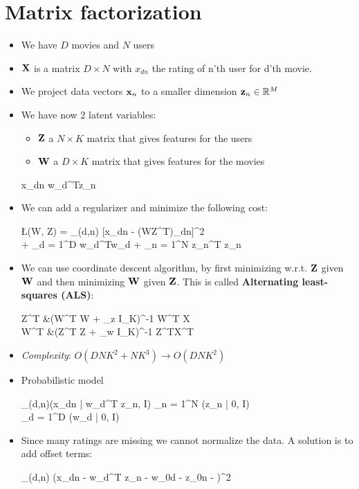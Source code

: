 
\section{Matrix factorization}
\begin{itemize}
	\item We have $D$ movies and $N$ users
	\item $\mathbf{X}$ is a matrix $D \times N$ with $x_{dn}$ the rating of n'th user for d'th movie.
	\item We project data vectors $\mathbf{x}_n$ to a smaller dimension $\mathbf{z}_n \in \Bbb R^M$
	\item We have now 2 latent variables:
	\begin{itemize}
		\item $\mathbf{Z}$ a $N \times K$ matrix that gives features for the users
	 	\item $\mathbf{W}$ a $D \times K$ matrix that gives features for the movies
	 \end{itemize} 
	 \begin{myalign*}
	     x_{dn} \approx \*w_d^T\*z_n
	 \end{myalign*}
	 \item We can add a regularizer and minimize the following cost:
	 \begin{myalign*}
	     \L(\*W, \*Z) = \sum_{(d,n)\in\Omega} [x_{dn} - (\*W\*Z^T)_{dn}]^2 \\ +  \sum_{d = 1}^D \*w_d^T\*w_d +  \sum_{n = 1}^N \*z_n^T \*z_n
	 \end{myalign*}
	 \item We can use coordinate descent algorithm, by first minimizing w.r.t. $\mathbf{Z}$ given $\mathbf{W}$ and then minimizing $\mathbf{W}$ given $\mathbf{Z}$. This is called \textbf{Alternating least-squares (ALS)}:
	 \begin{myalign*}
	     \*Z^T &\leftarrow (\*W^T \*W + \lambda_z \*I_K)^{-1} \*W^T \*X \\
	     \*W^T &\leftarrow (\*Z^T \*Z + \lambda_w \*I_K)^{-1} \*Z^T\*X^T
	 \end{myalign*}
	 \item \textit{Complexity}: $O(D N K^2 + N K^3) \rightarrow O(D N K^2)$
	 \item Probabilistic model
	 \begin{myalign*}
	     \prod_{(d,n)\in\Omega}\N(x_{dn} | \*w_d^T \*z_n, I) 
	     \times \prod_{n = 1}^N \N(\*z_n | 0,  I) \\
	     \times \prod_{d = 1}^D \N(\*w_d | 0,  I)
	 \end{myalign*}

	 \item Since many ratings are missing we cannot normalize the data. A solution is to add offset terms:
	 \begin{myalign*}
	      \sum_{(d,n)\in\Omega} (x_{dn} - \*w_d^T \*z_n - w_{0d} - z_{0n} - \mu)^2
	 \end{myalign*}
\end{itemize}

